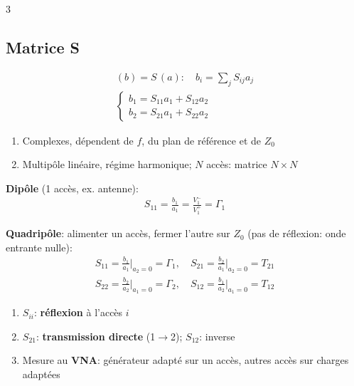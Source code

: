 \documentclass[12pt, a4paper]{article}
\begin{document}
\begin{multicols*}{3}
	\subsection{Matrice S}
	\begin{gather*}
		(b)=S\,(a):\quad b_i=\sum_jS_{ij}a_j\\
		\begin{cases}
			b_1=S_{11}a_1+S_{12}a_2 \\
			b_2=S_{21}a_1+S_{22}a_2
		\end{cases}
	\end{gather*}
	\begin{enumerate}[\roman*.]
		\item Complexes, dépendent de $f$, du plan de référence et de $Z_0$
		\item Multipôle linéaire, régime harmonique; $N$ accès: matrice $N\times N$
	\end{enumerate}
	\textbf{Dipôle} (1 accès, ex. antenne):
	\begin{gather*}
		S_{11}=\frac{b_1}{a_1}=\frac{V_1^-}{V_1^+}=\Gamma_1
	\end{gather*}

	\colbreak
	\textbf{Quadripôle}: alimenter un accès, fermer l'autre sur $Z_0$ (pas de réflexion: onde entrante nulle):
	\begin{gather*}
		S_{11}=\frac{b_1}{a_1}\Big|_{a_2=0}=\Gamma_1,\quad S_{21}=\frac{b_2}{a_1}\Big|_{a_2=0}=T_{21}\\
		S_{22}=\frac{b_2}{a_2}\Big|_{a_1=0}=\Gamma_2,\quad S_{12}=\frac{b_1}{a_2}\Big|_{a_1=0}=T_{12}
	\end{gather*}
	\begin{enumerate}[\roman*.]
		\item $S_{ii}$: \textbf{réflexion} à l'accès $i$
		\item $S_{21}$: \textbf{transmission directe} (1$\to$2); $S_{12}$: inverse
		\item Mesure au \textbf{VNA}: générateur adapté sur un accès, autres accès sur charges adaptées
	\end{enumerate}


\end{multicols*}
\end{document}
